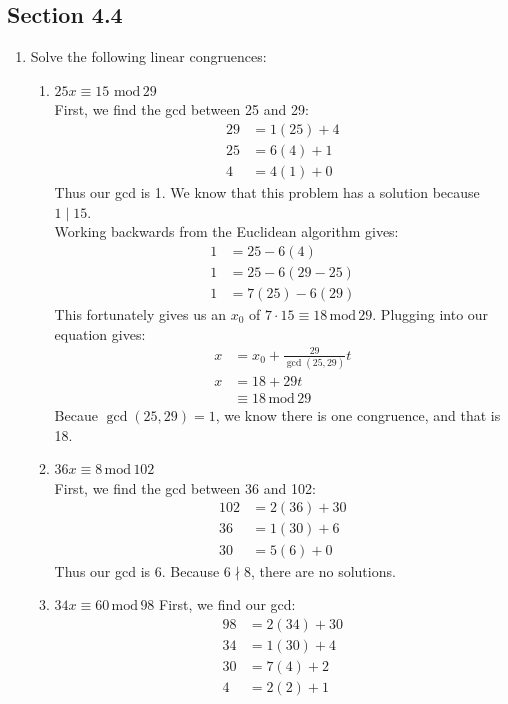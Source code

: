 \documentclass[10pt,oneside]{book}
\newcommand{\gspc}{\vspace{0.13cm}} %
\newcommand{\gline}{\gspc\\} %
\newcommand{\gmod}{\,\text{mod}\,}
\begin{document}
\newcommand{\cg}[1]{\color{OliveGreen}#1\color{white}}
\newcommand{\cb}[1]{\color{BlueViolet}#1\color{white}}

\subsection*{Section 4.4}
\begin{enumerate}
	\item Solve the following linear congruences:
	\begin{enumerate}
		\item $25x\equiv 15\,\gmod 29$\gline
		First, we find the gcd between 25 and 29:
		\begin{align*}
			29 &= 1(25) + 4\\
			25 &= 6(4) + 1\\
			4 &= 4(1) + 0
		\end{align*}
		Thus our gcd is 1. We know that this problem has a solution because $1\mid 15$. \gline
		Working backwards from the Euclidean algorithm gives:
		\begin{align*}
			1&= 25 - 6(4)\\
			1&= 25 - 6(29 - 25)\\
			1&= 7(25) - 6(29)
		\end{align*}
		This fortunately gives us an $x_0$ of $7\cdot 15 \equiv 18 \gmod 29$. Plugging into our equation gives:
		\begin{align*}
			x &= x_0 +\frac{29}{\gcd(25,29)}t\\
			x &= 18 + 29t\\
			&\equiv 18 \gmod 29
		\end{align*}
		Becaue $\gcd(25, 29) = 1$, we know there is one congruence, and that is 18.
		\item [(d)] $36x\equiv 8 \gmod 102$\gline
		First, we find the gcd between 36 and 102:
		\begin{align*}
			102 &= 2(36) + 30\\
			36 &= 1(30) + 6 \\
			30 &= 5(6) + 0
		\end{align*}
		Thus our gcd is 6. Because $6\nmid 8$, there are no solutions. 
		\item [(e)] $34x \equiv 60 \gmod 98$
		First, we find our gcd:
		\begin{align*}
			98 &= 2(34) + 30 \\
			34 &= 1(30) + 4\\
			30 &= 7(4) + 2\\
			4 &= 2(2) + 1
		\end{align*}

\end{enumerate}
\end{enumerate}
\end{document}
